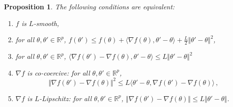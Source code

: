 \documentclass[11pt,reqno]{article}
\newcommand{\R}{\mathbb{R}}
\renewcommand{\leq}{\leqslant}
\numberwithin{equation}{section}
\theoremstyle{plain}
\newtheorem{proposition}[assumption]{Proposition}
\theoremstyle{definition}
\theoremstyle{remark}
\begin{document}
\begin{proposition}
	\label{prop:smooth-diff}
	The following conditions are equivalent:
	\begin{enumerate}[label=(\roman*)]
		\item $f$ is $L$-smooth,
		\item for all $\theta, \theta' \in \R^p$, $f(\theta') \leq f(\theta) + \langle \nabla f(\theta), \theta' - \theta\rangle + \frac{L}{2} \Vert \theta' - \theta \Vert^2$,
		\item for all $\theta, \theta' \in \R^p$, $\langle \nabla f(\theta') - \nabla f(\theta), \theta' - \theta \rangle \leq L \Vert \theta' - \theta \Vert^2$
		\item $\nabla f$ is co-coercive: for all $\theta, \theta' \in \R^p$,
		\begin{equation*}
			\Vert \nabla f(\theta') - \nabla f(\theta) \Vert^2 \leq L \langle \theta'-\theta, \nabla f(\theta') - \nabla f(\theta) \rangle \, ,
		\end{equation*}
		\item $\nabla f$ is $L$-Lipschitz: for all $\theta, \theta' \in \R^p$, $\Vert \nabla f(\theta') - \nabla f(\theta) \Vert \leq L \Vert \theta' - \theta \Vert$.
	\end{enumerate}
\end{proposition}
\end{document}
